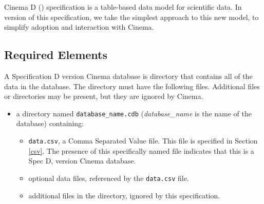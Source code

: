 Cinema D (\dietrich) specification is a table-based data model for scientific
data. In version \version of this specification, we take the simplest approach to
this new model, to simplify adoption and interaction with Cinema.

\subsection{Required Elements}

A Specification D version \version Cinema database is directory that contains all of
the data in the database. The directory must have the following files.
Additional files or directories may be present, but they are ignored by Cinema.

\begin{itemize}
\item a directory named \texttt{\small database\_name.cdb} 
  ({\em database\_name} is the name of the database) containing:
\begin{itemize}
\item \texttt{\small data.csv}, a Comma Separated Value file. This file is
  specified in Section \ref{csv}. The presence of this specifically named file 
  indicates that this is a Spec D, version \version Cinema database.
\item optional data files, referenced by the \texttt{\small data.csv} file.
\item additional files in the directory, ignored by this specification.
\end{itemize}
\end{itemize}
